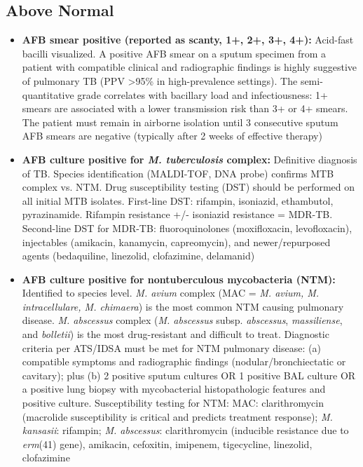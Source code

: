 \subsection*{Above Normal}
\begin{itemize}
  \item \textbf{AFB smear positive (reported as scanty, 1+, 2+, 3+, 4+):} Acid-fast bacilli visualized. A positive AFB smear on a sputum specimen from a patient with compatible clinical and radiographic findings is highly suggestive of pulmonary TB (PPV >95\% in high-prevalence settings). The semi-quantitative grade correlates with bacillary load and infectiousness: 1+ smears are associated with a lower transmission risk than 3+ or 4+ smears. The patient must remain in airborne isolation until 3 consecutive sputum AFB smears are negative (typically after 2 weeks of effective therapy)
  \item \textbf{AFB culture positive for \textit{M. tuberculosis} complex:} Definitive diagnosis of TB. Species identification (MALDI-TOF, DNA probe) confirms MTB complex vs. NTM. Drug susceptibility testing (DST) should be performed on all initial MTB isolates. First-line DST: rifampin, isoniazid, ethambutol, pyrazinamide. Rifampin resistance +/- isoniazid resistance = MDR-TB. Second-line DST for MDR-TB: fluoroquinolones (moxifloxacin, levofloxacin), injectables (amikacin, kanamycin, capreomycin), and newer/repurposed agents (bedaquiline, linezolid, clofazimine, delamanid)
  \item \textbf{AFB culture positive for nontuberculous mycobacteria (NTM):} Identified to species level. \textit{M. avium} complex (MAC = \textit{M. avium, M. intracellulare, M. chimaera}) is the most common NTM causing pulmonary disease. \textit{M. abscessus} complex (\textit{M. abscessus} subsp. \textit{abscessus}, \textit{massiliense}, and \textit{bolletii}) is the most drug-resistant and difficult to treat. Diagnostic criteria per ATS/IDSA must be met for NTM pulmonary disease: (a) compatible symptoms and radiographic findings (nodular/bronchiectatic or cavitary); plus (b) 2 positive sputum cultures OR 1 positive BAL culture OR a positive lung biopsy with mycobacterial histopathologic features and positive culture. Susceptibility testing for NTM: MAC: clarithromycin (macrolide susceptibility is critical and predicts treatment response); \textit{M. kansasii}: rifampin; \textit{M. abscessus}: clarithromycin (inducible resistance due to \textit{erm}(41) gene), amikacin, cefoxitin, imipenem, tigecycline, linezolid, clofazimine
\end{itemize}

